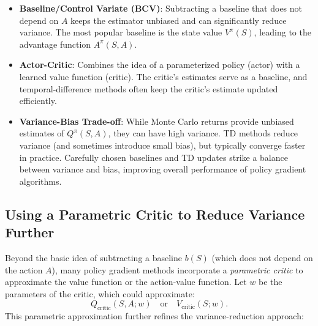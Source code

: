\begin{itemize}
    \item \textbf{Baseline/Control Variate (BCV)}: Subtracting a baseline that does not depend on \(A\) keeps the estimator unbiased and can significantly reduce variance. The most popular baseline is the state value \(V^\pi(S)\), leading to the advantage function \(A^\pi(S,A)\).
    \item \textbf{Actor-Critic}: Combines the idea of a parameterized policy (actor) with a learned value function (critic). The critic’s estimates serve as a baseline, and temporal-difference methods often keep the critic’s estimate updated efficiently.
    \item \textbf{Variance-Bias Trade-off}: While Monte Carlo returns provide unbiased estimates of \(Q^\pi(S,A)\), they can have high variance. TD methods reduce variance (and sometimes introduce small bias), but typically converge faster in practice. Carefully chosen baselines and TD updates strike a balance between variance and bias, improving overall performance of policy gradient algorithms.
\end{itemize}

\subsection{Using a Parametric Critic to Reduce Variance Further}

Beyond the basic idea of subtracting a baseline \(b(S)\) (which does not depend on the action \(A\)), many policy gradient methods incorporate a \emph{parametric critic} to approximate the value function or the action-value function. Let \(w\) be the parameters of the critic, which could approximate:
\[
  Q_{\text{critic}}(S,A; w) 
  \quad \text{or} \quad
  V_{\text{critic}}(S; w).
\]
This parametric approximation further refines the variance-reduction approach:

